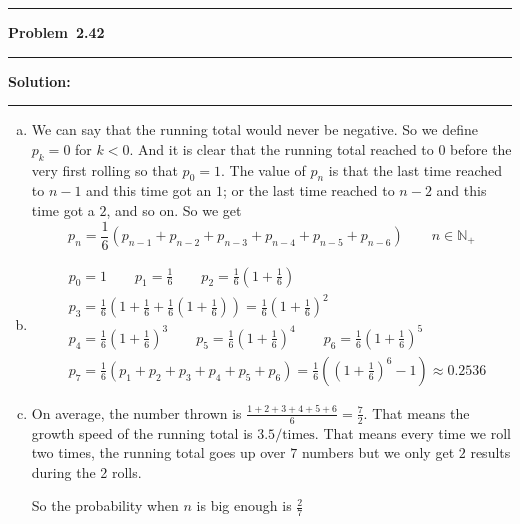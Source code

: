\documentclass[10.5pt]{article}
\newcommand\question[1]{\vspace{.2in}\hrule\vspace{0.04in}\textbf{Problem\ #1}\vspace{.4em}\hrule\vspace{.10in}}
\newcommand\Solution{\vspace{.3in}\textbf{Solution:}\vspace{.5em}\hrule\vspace{.08in}\par}
\begin{document}
\question{2.42}
	\Solution{}
	\begin{enumerate}[(a)]
		\item We can say that the running total would never be negative. So we define $p_k = 0$ for $k<0$. And it is clear that the running total reached to $0$ before the very first rolling
		so that $p_0 = 1$. The value of $p_n$ is that the last time reached to $n - 1$ and this time got an $1$; or the last time reached to $n - 2$ and this time got a $2$, and so on.
		So we get $$p_n = \frac{1}{6}(p_{n - 1}+p_{n - 2}+p_{n - 3}+p_{n - 4}+p_{n - 5}+p_{n - 6})\qquad n\in\mathbb{N}_+$$
		\vspace{2cm}


		\item \begin{align*}
			&p_0 = 1\qquad p_1 = \frac{1}{6}\qquad p_2 = \frac{1}{6}(1+\frac{1}{6})\\[8pt]
			&p_3 = \frac{1}{6}(1+\frac{1}{6}+\frac{1}{6}(1+\frac{1}{6}))=\frac{1}{6}(1+\frac{1}{6})^2\\[8pt]
			&p_4 = \frac{1}{6}(1+\frac{1}{6})^3\qquad p_5 = \frac{1}{6}(1+\frac{1}{6})^4\qquad p_6 = \frac{1}{6}(1+\frac{1}{6})^5\\[8pt]
			&p_7 = \frac{1}{6}(p_1+p_2+p_3+p_4+p_5+p_6) = \frac{1}{6}\left((1+\frac{1}{6})^6-1\right) \approx 0.2536
		\end{align*}

		\vspace{2cm}


		\item On average, the number thrown is $\frac{1+2+3+4+5+6}{6} = \frac{7}{2}$. That means the growth speed of the running total is $3.5/\text{times}$. That means every time we roll two times, the running total goes up over $7$ numbers but we only get $2$ results during the 2 rolls.
		
		So the probability when $n$ is big enough is $\frac{2}{7}$
	\end{enumerate}
		
\pagebreak
\end{document}
